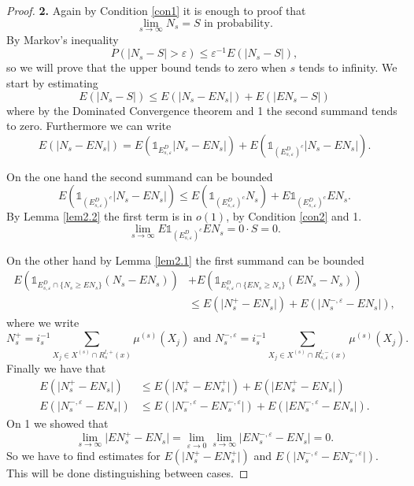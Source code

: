 \begin{proof}

\textbf{2.} Again by Condition \ref{con1} it is enough to proof that $$\lim_{s\rightarrow\infty}N_s=S\mbox{ in probability}.$$  By Markov's inequality $$P(\vert N_s-S\vert >\varepsilon)\leq \varepsilon^{-1}E(\vert N_s-S\vert), $$ so we will prove that the upper bound tends to zero when $s$ tends to infinity. We start by estimating
$$E(\vert N_s-S\vert)\leq E(\vert N_s-EN_s\vert)+E(\vert EN_s-S\vert) $$
where by the Dominated Convergence theorem and 1 the second summand tends to zero. Furthermore we can write $$E(\vert N_s-EN_s\vert)=E(\mathds{1}_{E^D_{s,\varepsilon}}\vert N_s-EN_s\vert)+E(\mathds{1}_{(E^D_{s,\varepsilon})^c}\vert N_s-EN_s\vert). $$ 

On the one hand the second summand can be bounded  $$E(\mathds{1}_{(E^D_{s,\varepsilon})^c}\vert N_s-EN_s\vert)\leq E(\mathds{1}_{(E^D_{s,\varepsilon})^c} N_s)+E\mathds{1}_{(E^D_{s,\varepsilon})^c}EN_s. $$ By Lemma \ref{lem2.2} the first term is in $o(1)$, by Condition \ref{con2} and 1. $$\lim_{s\rightarrow\infty}E\mathds{1}_{(E^D_{s,\varepsilon})^c} EN_s =0\cdot S=0.$$ 
 
On the other hand by Lemma \ref{lem2.1} the first summand can be bounded
\begin{align}
E(\mathds{1}_{E^D_{s,\varepsilon}\cap\lbrace N_s\geq EN_s\rbrace} (N_s-EN_s))&+E(\mathds{1}_{E^D_{s,\varepsilon}\cap\lbrace  EN_s\geq N_s \rbrace}(EN_s-N_s))\nonumber\\
&\leq E(\vert N_s^+-EN_s\vert)+E(\vert N_s^{-,\varepsilon}-EN_s\vert),\nonumber
\end{align}
where we write 
$$N^+_s=i^{-1}_s\sum_{X_j\in X^{(s)}\cap R^{l,+}_{s}(x)}\mu^{(s)}(X_j)\mbox{ and }N^{-,\varepsilon}_s=i^{-1}_s\sum_{X_j\in X^{(s)}\cap R^{l,-}_{s,\varepsilon}(x)}\mu^{(s)}(X_j).$$ Finally we have that 
\begin{align}
E(\vert N_s^+-EN_s\vert)&\leq E(\vert N_s^+-EN_s^+\vert)+E(\vert EN_s^+-E N_s\vert)\nonumber\\
E(\vert N_s^{-,\varepsilon}-EN_s\vert)&\leq E(\vert N_s^{-,\varepsilon}-EN_s^{-,\varepsilon}\vert)+E(\vert EN_s^{-,\varepsilon}-E N_s\vert).\nonumber
\end{align}
On 1 we showed that $$\lim_{s\rightarrow\infty}\vert EN_s^+-E N_s\vert=\lim_{\varepsilon\rightarrow 0}\lim_{s\rightarrow\infty}\vert EN_s^{-,\varepsilon}-EN_s\vert=0.$$ So we have to find estimates for $E(\vert N_s^+-EN_s^+\vert)$ and $E(\vert N_s^{-,\varepsilon}-EN_s^{-,\varepsilon}\vert)$. This will be done distinguishing between cases.


\end{proof}
